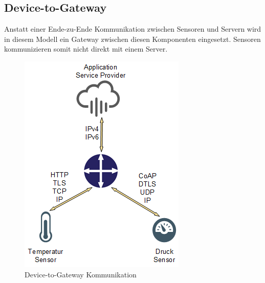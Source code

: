 \subsection{Device-to-Gateway}
Anstatt einer Ende-zu-Ende Kommunikation zwischen Sensoren und Servern wird in diesem Modell ein Gateway zwischen diesen Komponenten eingesetzt. Sensoren kommunizieren somit nicht direkt mit einem Server.
\begin{figure}[H]
\centering
\includegraphics[scale=0.8]{images/device-to-gateway.png}
\caption{Device-to-Gateway Kommunikation}
\end{figure}
